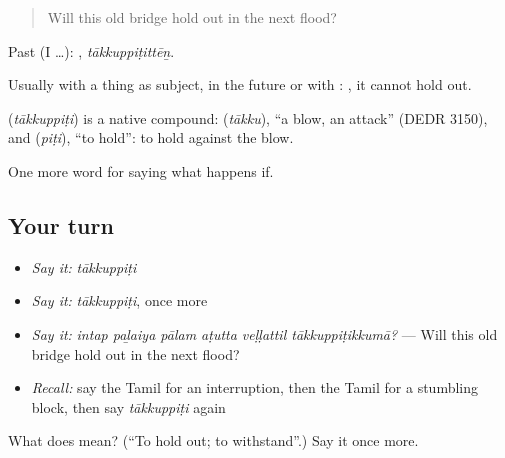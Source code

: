 \begin{quote}
Will this old bridge hold out in the next flood?
\end{quote}

Past (I …): , \emph{tākkuppiṭittēṉ}.

Usually with a thing as subject, in the future or with :  , it cannot hold out.

\begin{cousinweb}
\textbf{} (\emph{tākkuppiṭi}) is a native compound:  (\emph{tākku}), \textquotedblleft{}a blow, an attack\textquotedblright{} (DEDR 3150), and  (\emph{piṭi}), \textquotedblleft{}to hold\textquotedblright{}: to hold against the blow.
\end{cousinweb}

\begin{grammarlens}[title={What you've built}]
One more word for saying what happens if.
\end{grammarlens}

\subsection*{Your turn}
\begin{itemize}
\raggedright
  \item \emph{Say it:} \emph{tākkuppiṭi}
  \item \emph{Say it:} \emph{tākkuppiṭi}, once more
  \item \emph{Say it:} \emph{intap paḻaiya pālam aṭutta veḷḷattil tākkuppiṭikkumā?} — Will this old bridge hold out in the next flood?
  \item \emph{Recall:} say the Tamil for an interruption, then the Tamil for a stumbling block, then say \emph{tākkuppiṭi} again
\end{itemize}

\begin{tcolorbox}[breakable,colback=teal!4,colframe=teal!35!black,title={Before you move on}]
What does  mean? (\textquotedblleft{}To hold out; to withstand\textquotedblright{}.) Say it once more.
\end{tcolorbox}
